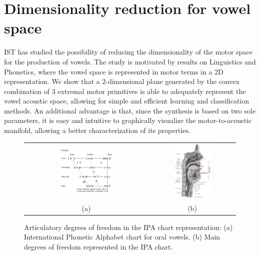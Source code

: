 \section{Dimensionality reduction for vowel space}

\label{sect:vowel}

IST has studied the possibility of reducing the dimensionality of the
motor space for the production of vowels. The study is motivated by results on Linguistics and
Phonetics, where the vowel space is represented in motor terms in a 2D
representation. We show that a 2-dimensional plane generated by the
convex combination of 3 extremal motor primitives is able to
adequately represent the vowel acoustic space, allowing for simple and
efficient learning and classification methods. An additional advantage
is that, since the synthesis is based on two sole parameters, it is
easy and intuitive to graphically visualize the motor-to-acoustic
manifold, allowing a better characterization of its properties. 

\begin{figure}[!h]
  \centering
\begin{tabular}{cc}
\includegraphics[width=0.45\textwidth]{include/vowels/images/vowels} &
\includegraphics[width=0.45\textwidth]{include/vowels/images/vtdiag} \\
(a) & (b) \\
\end{tabular}
\caption{Articulatory degrees of freedom in the IPA chart
  representation: (a) International Phonetic Alphabet chart for oral
  vowels. (b) Main degrees of freedom represented in the IPA chart.}
\label{fig:ipavowels}
\end{figure}

